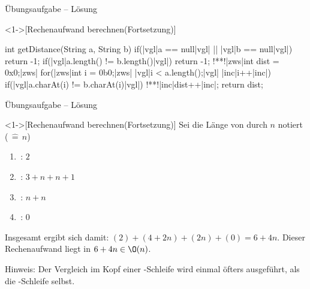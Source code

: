 \begin{frame}[fragile,c]{Übungsaufgabe -- Lösung}
    \addtocounter{solve}{-1}%
    \begin{solve}<1->[Rechenaufwand berechnen\hfill{}(Fortsetzung)]
\begin{plainjava}[language=xJava]
int getDistance(String a, String b){
    if(|vgl|a == null|vgl| || |vgl|b == null|vgl|) return -1;
    if(|vgl|a.length() != b.length()|vgl|) return -1;
    !**!|zws|int dist = 0x0;|zws|
    for(|zws|int i = 0b0;|zws| |vgl|i < a.length();|vgl| |inc|i++|inc|)
        if(|vgl|a.charAt(i) != b.charAt(i)|vgl|)
            !**!|inc|dist++|inc|;
    return dist;
}
\end{plainjava}
    \end{solve}
\end{frame}


\begin{frame}[c]{Übungsaufgabe -- Lösung}
    \addtocounter{solve}{-1}%
    \begin{solve}<1->[Rechenaufwand berechnen\hfill{}(Fortsetzung)]
        \pause{}Sei die Länge von  durch \(n\) notiert (\(\,\widehat{=}\, n\))
\begin{multicols}{2}
    \begin{enumerate}[<+(1)->]
        \item {}\,: \(2\)
        \item {}\,: \(3 + n + n + 1\)
        \item {}\,: \(n+n\)
        \item {}\,: \(0\)
    \end{enumerate}
\end{multicols}
    \pause{}Insgesamt ergibt sich damit: \((2) + (4 + 2n) + (2n) + (0) = 6 + 4n\).\pause{} Dieser Rechenaufwand liegt in \(6 + 4n \in \O(n)\).\smallskip\par\pause{}Hinweis: Der Vergleich im Kopf einer -Schleife wird einmal öfters ausgeführt,\pause{} als die -Schleife selbst.
    \end{solve}
\end{frame}


